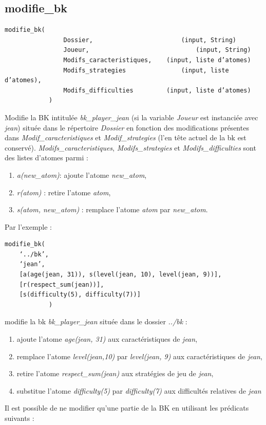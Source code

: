 \documentclass[a4paper,12pt]{article}
\begin{document}
\subsection{modifie\_bk}

\begin{Verbatim}
modifie_bk(
				Dossier, 						(input, String)
				Joueur, 							(input, String)
				Modifs_caracteristiques, 	(input, liste d’atomes)
				Modifs_strategies				(input, liste d’atomes),
				Modifs_difficulties			(input, liste d’atomes)
			)
\end{Verbatim}

Modifie la BK intitulée \emph{bk\_player\_jean} (si la variable \emph{Joueur} est instanciée avec \emph{jean}) située dans le répertoire \emph{Dossier}
en fonction des modifications présentes dans \emph{Modif\_caracteristiques} et \emph{Modif\_strategies} (l’en tête actuel de la bk est conservé).
 \emph{Modifs\_caracteristiques}, \emph{Modifs\_strategies} et \emph{Modifs\_difficulties} sont des listes d’atomes parmi :
 \begin{enumerate}
 	\item \emph{a(new\_atom)}: ajoute l’atome \emph{new\_atom},
 	\item \emph{r(atom)} : retire l’atome \emph{atom},
 	\item \emph{s(atom, new\_atom)} : remplace l’atome \emph{atom} par \emph{new\_atom}.
 \end{enumerate}
 
 Par l’exemple :
 \begin{Verbatim}
modifie_bk(
	‘../bk’, 						
	‘jean’, 						
	[a(age(jean, 31)), s(level(jean, 10), level(jean, 9))], 	
	[r(respect_sum(jean))],
	[s(difficulty(5), difficulty(7))]
			)
\end{Verbatim}
modifie la bk \emph{bk\_player\_jean} située dans le dossier \emph{../bk} :
\begin{enumerate}
\item ajoute l’atome \emph{age(jean, 31)} aux caractéristiques de \emph{jean},
\item remplace l’atome \emph{level(jean,10)} par \emph{level(jean, 9)} aux caractéristiques de \emph{jean},
\item retire l’atome \emph{respect\_sum(jean)} aux stratégies de jeu de \emph{jean},
\item substitue l’atome \emph{difficulty(5)} par \emph{difficulty(7)} aux difficultés relatives de \emph{jean}
\end{enumerate}

Il est possible de ne modifier qu’une partie de la BK en utilisant les prédicats suivants :
\end{document}
